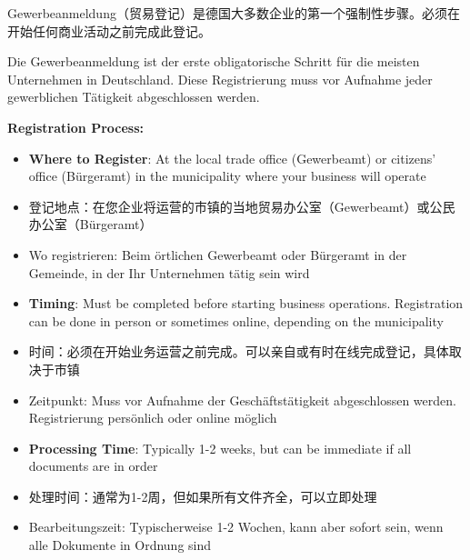 Gewerbeanmeldung（贸易登记）是德国大多数企业的第一个强制性步骤。必须在开始任何商业活动之前完成此登记。

Die Gewerbeanmeldung ist der erste obligatorische Schritt für die meisten Unternehmen in Deutschland. Diese Registrierung muss vor Aufnahme jeder gewerblichen Tätigkeit abgeschlossen werden.

\textbf{Registration Process:}
\begin{itemize}
    \item \textbf{Where to Register}: At the local trade office (Gewerbeamt) or citizens' office (Bürgeramt) in the municipality where your business will operate
    \item 登记地点：在您企业将运营的市镇的当地贸易办公室（Gewerbeamt）或公民办公室（Bürgeramt）
    \item Wo registrieren: Beim örtlichen Gewerbeamt oder Bürgeramt in der Gemeinde, in der Ihr Unternehmen tätig sein wird
    
    \item \textbf{Timing}: Must be completed before starting business operations. Registration can be done in person or sometimes online, depending on the municipality
    \item 时间：必须在开始业务运营之前完成。可以亲自或有时在线完成登记，具体取决于市镇
    \item Zeitpunkt: Muss vor Aufnahme der Geschäftstätigkeit abgeschlossen werden. Registrierung persönlich oder online möglich
    
    \item \textbf{Processing Time}: Typically 1-2 weeks, but can be immediate if all documents are in order
    \item 处理时间：通常为1-2周，但如果所有文件齐全，可以立即处理
    \item Bearbeitungszeit: Typischerweise 1-2 Wochen, kann aber sofort sein, wenn alle Dokumente in Ordnung sind
\end{itemize}

